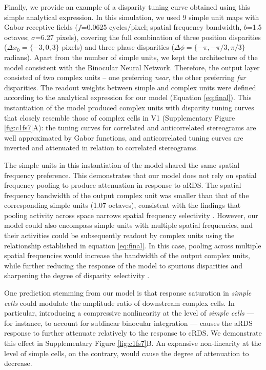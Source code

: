 Finally, we provide an example of a disparity tuning curve obtained using this simple analytical expression. In this simulation, we used 9 simple unit maps with Gabor receptive fields ($f$=0.0625 cycles/pixel; spatial frequency bandwidth, $b$=1.5 octaves; $\sigma$=6.27 pixels), covering the full combination of three position disparities ($\Delta x_0 = \{-3, 0, 3\}$ pixels) and three phase disparities ($\Delta \phi = \{-\pi, -\pi/3, \pi/3\}$ radians). Apart from the number of simple units, we kept the architecture of the model consistent with the Binocular Neural Network. Therefore, the output layer consisted of two complex units -- one preferring \textit{near}, the other preferring \textit{far} disparities. The readout weights between simple and complex units were defined according to the analytical expression for our model (Equation \ref{eq:final}). This instantiation of the model produced complex units with disparity tuning curves that closely resemble those of complex cells in V1 (Supplementary Figure \ref{fig:c1fs7}A): the tuning curves for correlated and anticorrelated stereograms are well approximated by Gabor functions, and anticorrelated tuning curves are inverted and attenuated in relation to correlated stereograms. 

The simple units in this instantiation of the model shared the same spatial frequency preference. This demonstrates that our model does not rely on spatial frequency pooling to produce attenuation in response to aRDS. The spatial frequency bandwidth of the output complex unit was smaller than that of the corresponding simple units (1.07 octaves), consistent with the findings that pooling activity across space narrows spatial frequency selectivity \cite{Kato:2016fk}. However, our model could also encompass simple units with multiple spatial frequencies, and their activities could be subsequently readout by complex units using the relationship established in equation \ref{eq:final}. In this case, pooling across multiple spatial frequencies would increase the bandwidth of the output complex units, while further reducing the response of the model to spurious disparities \cite{Fleet:1996tq} and sharpening the degree of disparity selectivity \cite{Baba:2015ij,Kato:2016fk}. 

One prediction stemming from our model is that response saturation in \textit{simple cells} could modulate the amplitude ratio of downstream complex cells. In particular, introducing a compressive nonlinearity at the level of \textit{simple cells} --- for instance, to account for sublinear binocular integration \cite{Longordo2013} --- causes the aRDS response to further attenuate relatively to the response to cRDS. We demonstrate this effect in Supplementary Figure \ref{fig:c1fs7}B. An expansive non-linearity at the level of simple cells, on the contrary, would cause the degree of attenuation to decrease.

